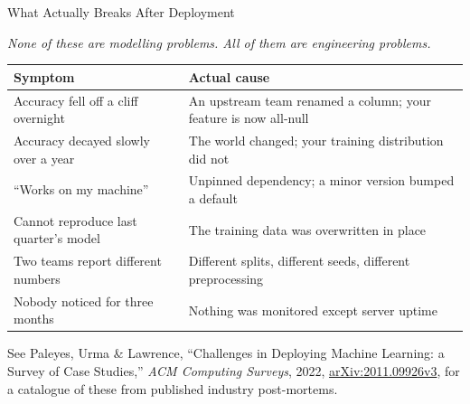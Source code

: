 
\begin{frame}{What Actually Breaks After Deployment}

    \centering
    \textit{None of these are modelling problems. All of them are engineering problems.}
    \vspace{0.18em}

    \renewcommand{\arraystretch}{1.35}
    {\scriptsize
    \begin{tabular}{p{4.0cm}|p{7.4cm}}
        \toprule
        \textbf{Symptom} & \textbf{Actual cause} \\
        \midrule
        Accuracy fell off a cliff overnight & An upstream team renamed a column; your feature is now all-null \\
        Accuracy decayed slowly over a year & The world changed; your training distribution did not \\
        ``Works on my machine'' & Unpinned dependency; a minor version bumped a default \\
        Cannot reproduce last quarter's model & The training data was overwritten in place \\
        Two teams report different numbers & Different splits, different seeds, different preprocessing \\
        Nobody noticed for three months & Nothing was monitored except server uptime \\
        \bottomrule
    \end{tabular}}

    \vspace{0.24em}
    {\scriptsize See Paleyes, Urma \& Lawrence, ``Challenges in Deploying Machine Learning: a Survey of Case Studies,''
    \textit{ACM Computing Surveys}, 2022, \href{https://arxiv.org/abs/2011.09926v3}{arXiv:2011.09926v3}, for a
    catalogue of these from published industry post-mortems.}

\end{frame}
